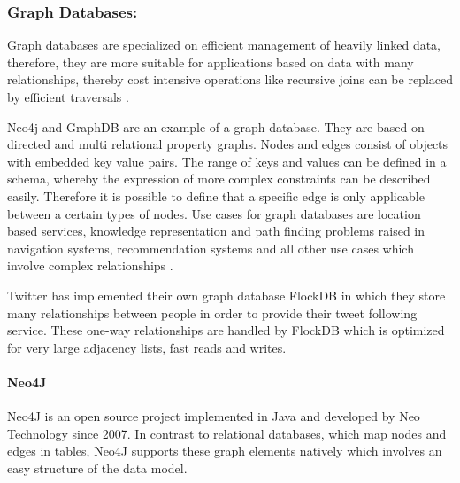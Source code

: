 \subsubsection{Graph Databases:}
Graph databases are specialized on efficient management of heavily linked data, therefore, they are more suitable for applications based on data with many relationships, thereby cost intensive operations like recursive joins can be replaced by efficient traversals \cite{Hecht:2011}.

Neo4j and GraphDB are an example of a graph database. They are based on directed and multi relational property graphs. Nodes and edges consist of objects with embedded key value pairs. The range of keys and values can be defined in a schema, whereby the expression of more complex constraints can be described easily. Therefore it is possible to define that a specific edge is only applicable between a certain types of nodes. Use cases for graph databases are location based services, knowledge representation and path finding problems raised in navigation systems, recommendation systems and all other use cases which involve complex relationships \cite{Hecht:2011}.


Twitter has implemented their own graph database FlockDB in which they store many relationships between people in order to provide their tweet following service. These one-way relationships are handled by FlockDB which is optimized for very large adjacency lists, fast reads and writes.


\paragraph{Neo4J}
Neo4J is an open source project implemented in Java and developed by Neo Technology since 2007. In contrast to relational databases, which map nodes and edges in tables, Neo4J supports these graph elements natively which involves an easy structure of the data model.

